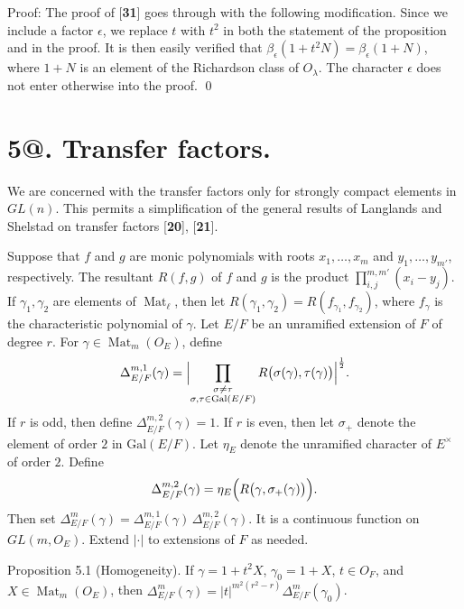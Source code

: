 \documentclass{amsart}
\begin{document}
\pproclaim Proof:
The proof of  [{\bf 31}] goes through with the following
  modification.
Since we include a factor
  $ \epsilon $, 
we replace $t$ with $t^2$ in both the statement of the 
  proposition and in the proof.
It is then easily verified that
  $ \beta_{\epsilon} (1 + t^2 N) = 
    \beta_{\epsilon} (1 + N) $, where
  $ 1 + N $ is
an element of the Richardson class of 
  $ O_{\lambda} $.
The character 
  $ \epsilon $
does not enter otherwise into the proof.
\qed
\finishpproclaim

\section{{\bf 5@.  Transfer factors.}}

\medskip
\noindent
We are concerned with the transfer factors only for strongly compact
  elements in
  $ GL (n) $.
This permits a simplification of the general results of
  Langlands and Shelstad on transfer factors [{\bf 20}], [{\bf 21}].

Suppose that $f$ and $g$ are monic polynomials with roots
  $ x_1, \dots , x_m $ 
and
  $ y_1, \dots , y_{m'} $,
respectively.
The resultant
  $ R(f,g) $
of $f$ and $g$ is the product
  $ \prod_{i,j}^{m,m'} (x_i-y_j) $.
If
  $ \gamma_1, \gamma_2 $
are elements of 
  $ \operatorname{Mat}_{\ell} $, then
let
  $ R (\gamma_1, \gamma_2) =
    R (f_{\gamma_1}, f_{\gamma_2} ) $,
where 
  $ f_{\gamma} $
is the characteristic polynomial of 
  $ \gamma $.
Let 
  $ E / F $ 
be an unramified extension of $F$ of degree $r$.
For
  $ \gamma \in \operatorname{Mat}_m (O_E) $,
define
%
$$  
  \Delta_{E/F}^{m,1} (\gamma) =
    \Bigl|
      \prod_{\substack{
         \sigma \neq \tau \\
         \sigma, \tau \in \text{Gal} (E/F)
       }}
       R 
       \bigl(
          \sigma (\gamma), \tau (\gamma)
       \bigr)
    \Bigr|^{\frac12} .
$$
%
If $r$ is odd, then define
  $ \Delta_{E/F}^{m,2} (\gamma) = 1 $.
If $r$ is even,  then let
  $ \sigma_+ $
denote the element of order $2$ in 
  $ \text{Gal} (E/F) $.
Let
  $ \eta_E $
denote the unramified character of
  $ E^{\times} $ 
of order $2$.
Define
  $$ \Delta_{E/F}^{m,2}
    (\gamma) =
    \eta_E
    \Bigl(
      R 
      \bigl(
        \gamma,\sigma_+ (\gamma) 
      \bigr)
     \Bigr) .$$
Then set
  $ \Delta_{E/F}^m (\gamma) = 
    \Delta_{E/F}^{m, 1} (\gamma) \,
    \Delta_{E/F}^{m,2} (\gamma) $.
It is a continuous function on
  $ GL(m, O_E) $.
Extend
  $ | \cdot | $
to extensions of $F$ as needed.

\bigskip
\proclaim Proposition {5.1} (Homogeneity).
If
  $ \gamma = 1 + t^2 X $,
  $ \gamma_0 = 1 + X $,
  $ t \in O_F $, and 
  $ X \in \operatorname{Mat}_m (O_E) $,
then
  $ \Delta_{E/F}^m (\gamma) =
     |t|^{m^2 (r^2-r) } 
    \Delta_{E/F}^m (\gamma_0) $.
\finishproclaim
\end{document}
